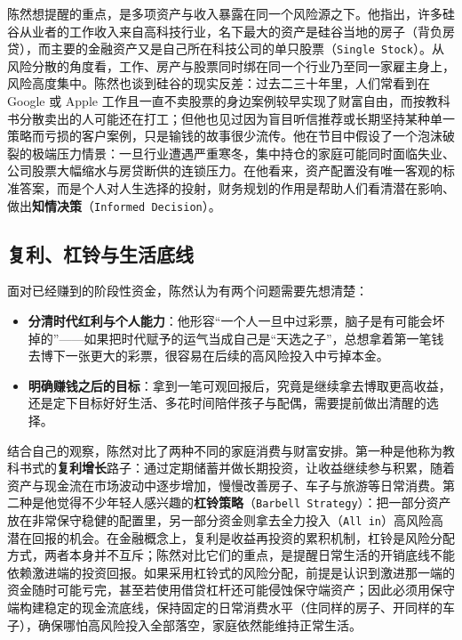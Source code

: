 \documentclass[UTF8,a4paper,11pt,fontset=fandol]{ctexart}
\begin{document}
陈然想提醒的重点，是多项资产与收入暴露在同一个风险源之下。他指出，许多硅谷从业者的工作收入来自高科技行业，名下最大的资产是硅谷当地的房子（背负房贷），而主要的金融资产又是自己所在科技公司的单只股票（\texttt{Single Stock}）。从风险分散的角度看，工作、房产与股票同时绑在同一个行业乃至同一家雇主身上，风险高度集中。陈然也谈到硅谷的现实反差：过去二三十年里，人们常看到在 Google 或 Apple 工作且一直不卖股票的身边案例较早实现了财富自由，而按教科书分散卖出的人可能还在打工；但他也见过因为盲目听信推荐或长期坚持某种单一策略而亏损的客户案例，只是输钱的故事很少流传。他在节目中假设了一个泡沫破裂的极端压力情景：一旦行业遭遇严重寒冬，集中持仓的家庭可能同时面临失业、公司股票大幅缩水与房贷断供的连锁压力。在他看来，资产配置没有唯一客观的标准答案，而是个人对人生选择的投射，财务规划的作用是帮助人们看清潜在影响、做出\textbf{知情决策}（\texttt{Informed Decision}）。

\subsection{复利、杠铃与生活底线}
面对已经赚到的阶段性资金，陈然认为有两个问题需要先想清楚：
\begin{itemize}
\item \textbf{分清时代红利与个人能力}：他形容“一个人一旦中过彩票，脑子是有可能会坏掉的”——如果把时代赋予的运气当成自己是“天选之子”，总想拿着第一笔钱去博下一张更大的彩票，很容易在后续的高风险投入中亏掉本金。
\item \textbf{明确赚钱之后的目标}：拿到一笔可观回报后，究竟是继续拿去博取更高收益，还是定下目标好好生活、多花时间陪伴孩子与配偶，需要提前做出清醒的选择。
\end{itemize}

结合自己的观察，陈然对比了两种不同的家庭消费与财富安排。第一种是他称为教科书式的\textbf{复利增长}路子：通过定期储蓄并做长期投资，让收益继续参与积累，随着资产与现金流在市场波动中逐步增加，慢慢改善房子、车子与旅游等日常消费。第二种是他觉得不少年轻人感兴趣的\textbf{杠铃策略}（\texttt{Barbell Strategy}）：把一部分资产放在非常保守稳健的配置里，另一部分资金则拿去全力投入（\texttt{All in}）高风险高潜在回报的机会。在金融概念上，复利是收益再投资的累积机制，杠铃是风险分配方式，两者本身并不互斥；陈然对比它们的重点，是提醒日常生活的开销底线不能依赖激进端的投资回报。如果采用杠铃式的风险分配，前提是认识到激进那一端的资金随时可能亏完，甚至若使用借贷杠杆还可能侵蚀保守端资产；因此必须用保守端构建稳定的现金流底线，保持固定的日常消费水平（住同样的房子、开同样的车子），确保哪怕高风险投入全部落空，家庭依然能维持正常生活。
\end{document}
